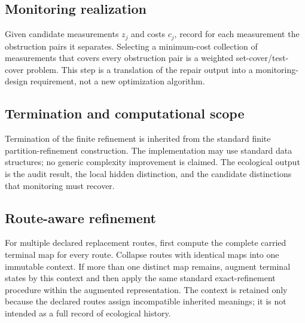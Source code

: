 \subsection{Monitoring realization}
Given candidate measurements $z_j$ and costs $c_j$, record for each measurement the obstruction pairs it separates. Selecting a minimum-cost collection of measurements that covers every obstruction pair is a weighted set-cover/test-cover problem. This step is a translation of the repair output into a monitoring-design requirement, not a new optimization algorithm.

\subsection{Termination and computational scope}
Termination of the finite refinement is inherited from the standard finite partition-refinement construction. The implementation may use standard data structures; no generic complexity improvement is claimed. The ecological output is the audit result, the local hidden distinction, and the candidate distinctions that monitoring must recover.

\subsection{Route-aware refinement}
For multiple declared replacement routes, first compute the complete carried terminal map for every route. Collapse routes with identical maps into one immutable context. If more than one distinct map remains, augment terminal states by this context and then apply the same standard exact-refinement procedure within the augmented representation. The context is retained only because the declared routes assign incompatible inherited meanings; it is not intended as a full record of ecological history.
